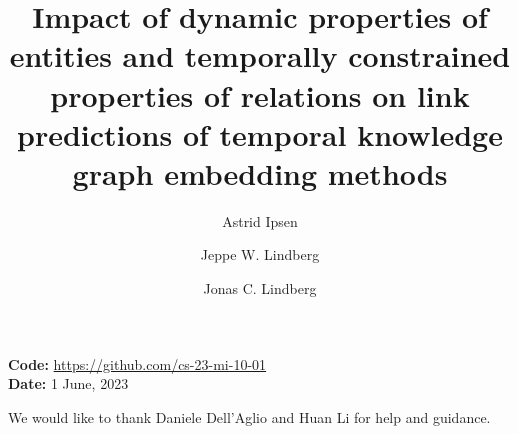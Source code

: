\documentclass[sigconf,screen,nonacm=true]{acm_files/acmart}
\begin{document}
\fancyfoot[C]{\thepage/\pageref*{TotPages}}
\title{Impact of dynamic properties of entities and temporally constrained properties of relations on link predictions of temporal knowledge graph embedding methods}
\renewcommand{\footskip}{16mm}

\author{Astrid Ipsen}

\author{Jeppe W. Lindberg}

\author{Jonas C. Lindberg}

\begin{abstract}
\missing
\end{abstract}

%

\maketitle


\textbf{Code:} \url{https://github.com/cs-23-mi-10-01}
\\
\textbf{Date:} 1 June, 2023













\begin{acks}
    We would like to thank Daniele Dell'Aglio and Huan Li for help and guidance.
\end{acks}




\pagebreak
\appendix



\end{document}
